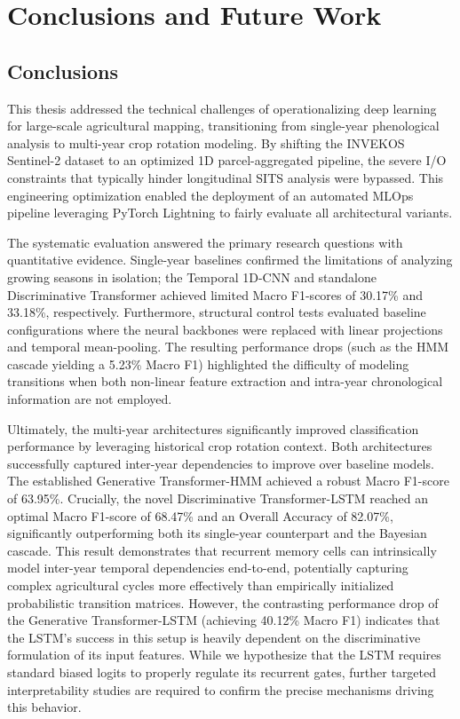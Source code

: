 \chapter{Conclusions and Future Work}
\label{cha:conclusion}

\section{Conclusions}
\label{sec:conclusions}

This thesis addressed the technical challenges of operationalizing deep learning for large-scale agricultural mapping,
transitioning from single-year phenological analysis to multi-year crop rotation modeling.
By shifting the INVEKOS Sentinel-2 dataset to an optimized 1D parcel-aggregated pipeline,
the severe I/O constraints that typically hinder longitudinal SITS analysis were bypassed.
This engineering optimization enabled the deployment of an automated MLOps pipeline leveraging PyTorch Lightning to fairly evaluate all architectural variants.

The systematic evaluation answered the primary research questions with quantitative evidence.
Single-year baselines confirmed the limitations of analyzing growing seasons in isolation;
the Temporal 1D-CNN and standalone Discriminative Transformer achieved limited Macro F1-scores of 30.17\% and 33.18\%, respectively.
Furthermore, structural control tests evaluated baseline configurations where the neural backbones were replaced with linear projections and temporal mean-pooling.
The resulting performance drops (such as the HMM cascade yielding a 5.23\% Macro F1) highlighted the
difficulty of modeling transitions when both non-linear feature extraction and intra-year chronological information are not employed.

Ultimately, the multi-year architectures significantly improved classification performance by leveraging historical crop rotation context.
Both architectures successfully captured inter-year dependencies to improve over baseline models.
The established Generative Transformer-HMM achieved a robust Macro F1-score of 63.95\%.
Crucially, the novel Discriminative Transformer-LSTM reached an optimal Macro F1-score of 68.47\% and an Overall Accuracy of 82.07\%,
significantly outperforming both its single-year counterpart and the Bayesian cascade.
This result demonstrates that recurrent memory cells can intrinsically model inter-year temporal dependencies end-to-end,
potentially capturing complex agricultural cycles more effectively than empirically initialized probabilistic transition matrices. 
However, the contrasting performance drop of the Generative Transformer-LSTM (achieving 40.12\% Macro F1)
indicates that the LSTM's success in this setup is heavily dependent on the discriminative formulation of its input features.
While we hypothesize that the LSTM requires standard biased logits to properly regulate its recurrent gates,
further targeted interpretability studies are required to confirm the precise mechanisms driving this behavior.


